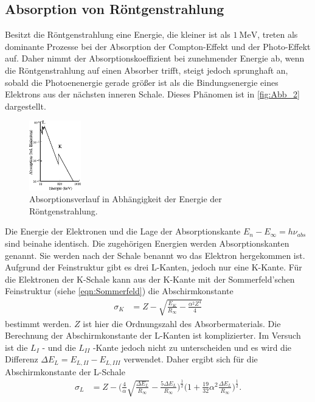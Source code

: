 
\subsection{Absorption von Röntgenstrahlung} %
\label{sub:Absorption}

Besitzt die Röntgenstrahlung eine Energie, die kleiner ist als $\qty{1}{\mega\electronvolt}$, treten als dominante Prozesse bei der
Absorption der Compton-Effekt und der Photo-Effekt auf. Daher nimmt der Absorptionskoeffizient bei zunehmender Energie ab, wenn die
Röntgenstrahlung auf einen Absorber trifft, steigt jedoch sprunghaft an, sobald die Photoenenergie gerade größer ist als die
Bindungsenergie eines Elektrons aus der nächsten inneren Schale. Dieses Phänomen ist in \autoref{fig:Abb_2} dargestellt.
\begin{figure}[H]
    \centering
    \includegraphics[width=0.2\textwidth]{build/Abb_2.pdf}
    \caption{Absorptionsverlauf in Abhängigkeit der Energie der Röntgenstrahlung.\cite{V602}}
    \label{fig:Abb_2}
\end{figure}
Die Energie der Elektronen und die Lage der Absorptionskante $E_n - E_\infty = h \nu_{abs}$ sind beinahe identisch. Die zugehörigen
Energien  werden Absorptionskanten genannt. Sie werden nach der Schale benannt wo das Elektron hergekommen ist.
Aufgrund der Feinstruktur gibt es drei L-Kanten, jedoch nur eine K-Kante.
Für die Elektronen der K-Schale kann aus der K-Kante mit der Sommerfeld'schen Feinstruktur (siehe \autoref{eqn:Sommerfeld}) die
Abschirmkonstante
\begin{align}
    \sigma_K &= Z - \sqrt{\frac{E_K}{R_\infty} - \frac{\alpha^2 Z^4}{4}} \label{eqn:sigmak}
\end{align}
bestimmt werden. $Z$ ist hier die Ordnungszahl des Absorbermaterials.
Die Berechnung der Abschirmkonstante der L-Kanten ist komplizierter.
Im Versuch ist die $L_I$ - und die $L_{II}$ -Kante jedoch nicht zu unterscheiden und es wird die Differenz $\Delta E_L = E_{L,II} - E_{L,III}$
verwendet.
Daher ergibt sich für die Abschirmkonstante der L-Schale
\begin{align}
    \sigma_L &=  Z - \Biggl(\frac{4}{\alpha} \sqrt{\frac{\Delta E_L}{R_\infty}}-\frac{5 \Delta E_L}{R_\infty}\Biggr)^{\frac{1}{2}}
    \Biggl(1 + \frac{19}{32} \alpha^2 \frac{\Delta E_L}{R_\infty} \Biggr)^{\frac{1}{2}}. \label{eqn:sigmal}
\end{align}

